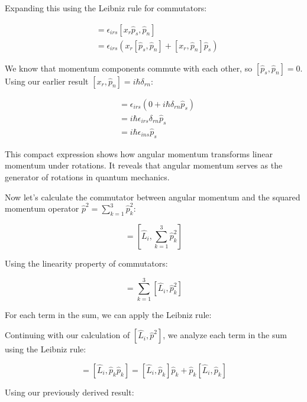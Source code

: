\documentclass[italian]{HKNdocument}
\begin{document}
Expanding this using the Leibniz rule for commutators:

\begin{align}
[\hat{L}_i, \hat{p}_n] &= \epsilon_{irs}[x_r\hat{p}_s, \hat{p}_n] \\
&= \epsilon_{irs}(x_r[\hat{p}_s, \hat{p}_n] + [x_r, \hat{p}_n]\hat{p}_s) \label{eq:1.65}
\end{align}

We know that momentum components commute with each other, so $[\hat{p}_s, \hat{p}_n] = 0$. Using our earlier result $[x_r, \hat{p}_n] = i\hbar\delta_{rn}$:

\begin{align}
[\hat{L}_i, \hat{p}_n] &= \epsilon_{irs}(0 + i\hbar\delta_{rn}\hat{p}_s) \\
&= i\hbar\epsilon_{irs}\delta_{rn}\hat{p}_s \\
&= i\hbar\epsilon_{ins}\hat{p}_s
\end{align}

This compact expression shows how angular momentum transforms linear momentum under rotations. It reveals that angular momentum serves as the generator of rotations in quantum mechanics.

Now let's calculate the commutator between angular momentum and the squared momentum operator $\hat{p}^2 = \sum_{k=1}^3 \hat{p}_k^2$:

\begin{equation}
[\hat{L}_i, \hat{p}^2] = \left[\hat{L}_i, \sum_{k=1}^3 \hat{p}_k^2\right] \label{eq:1.66}
\end{equation}

Using the linearity property of commutators:

\begin{equation}
[\hat{L}_i, \hat{p}^2] = \sum_{k=1}^3 [\hat{L}_i, \hat{p}_k^2] \label{eq:1.67}
\end{equation}

For each term in the sum, we can apply the Leibniz rule:

Continuing with our calculation of $[\hat{L}_i, \hat{p}^2]$, we analyze each term in the sum using the Leibniz rule:

\begin{equation}
[\hat{L}_i, \hat{p}_k^2] = [\hat{L}_i, \hat{p}_k\hat{p}_k] = [\hat{L}_i, \hat{p}_k]\hat{p}_k + \hat{p}_k[\hat{L}_i, \hat{p}_k] \label{eq:1.68}
\end{equation}

Using our previously derived result:
\end{document}
